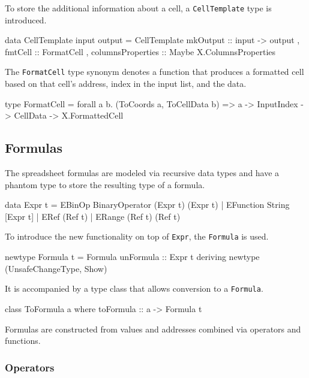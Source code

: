 To store the additional information about a cell, a \texttt{CellTemplate} type is introduced.

\begin{mycode}
data CellTemplate input output = CellTemplate
  { mkOutput :: input -> output
  , fmtCell :: FormatCell
  , columnsProperties :: Maybe X.ColumnsProperties
  }
\end{mycode}

The \texttt{FormatCell} type synonym denotes a function that produces a formatted cell based on that cell's address, index in the input list, and the data.

\begin{mycode}
type FormatCell = 
  forall a b. (ToCoords a, ToCellData b) => 
    a -> InputIndex -> CellData -> X.FormattedCell
\end{mycode}

\subsection{Formulas}
\label{sec:formulas}

The spreadsheet formulas are modeled via recursive data types and have a phantom type to store the resulting type of a formula.

\begin{mycode}
data Expr t
  = EBinOp BinaryOperator (Expr t) (Expr t)
  | EFunction String [Expr t]
  | ERef (Ref t)
  | ERange (Ref t) (Ref t)
\end{mycode}

To introduce the new functionality on top of \texttt{Expr}, the \texttt{Formula} is used.

\begin{mycode}
newtype Formula t = Formula {unFormula :: Expr t}
  deriving newtype (UnsafeChangeType, Show)
\end{mycode}

It is accompanied by a type class that allows conversion to a \texttt{Formula}.

\begin{mycode}
class ToFormula a where
  toFormula :: a -> Formula t
\end{mycode}

Formulas are constructed from values and addresses combined via operators and functions.

\subsubsection{Operators}
\label{sec:operators}

